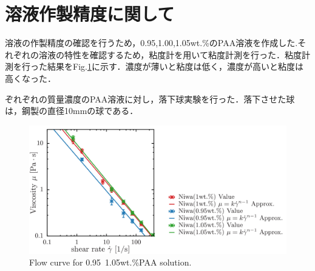 \section{溶液作製精度に関して}

溶液の作製精度の確認を行うため，0.95,1.00,1.05wt.\%のPAA溶液を作成した.それぞれの溶液の特性を確認するため，粘度計を用いて粘度計測を行った．粘度計測を行った結果をFig.\ref{fig:95-105}に示す．濃度が薄いと粘度は低く，濃度が高いと粘度は高くなった．

ぞれぞれの質量濃度のPAA溶液に対し，落下球実験を行った．落下させた球は，鋼製の直径10mmの球である．

\begin{figure}[ht]
    \includegraphics[width=15cm,clip]{5-Discussion/95-105.png}
    \caption{Flow curve for 0.95~1.05wt.\%PAA solution.}
    \label{fig:95-105}
\end{figure}

